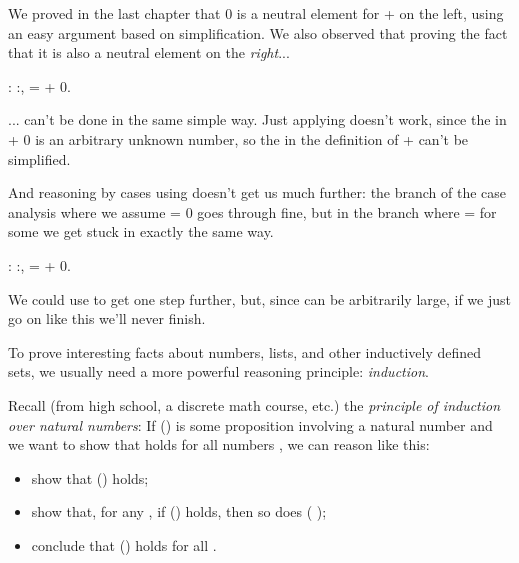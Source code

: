 \documentclass[12pt]{report}
\begin{document}
 We proved in the last chapter that 0 is a neutral element
    for + on the left, using an easy argument based on
    simplification.  We also observed that proving the fact that it is
    also a neutral element on the \textit{right}... \begin{coqdoccode}
\coqdocemptyline
\coqdocnoindent
{}  : \coqdockw{\ensuremath{\forall}} :,\coqdoceol
\coqdocindent{1.00em}
 =  + 0.\coqdoceol
\end{coqdoccode}
... can't be done in the same simple way.  Just applying
   doesn't work, since the  in  + 0 is an arbitrary
  unknown number, so the  in the definition of + can't be
  simplified.  \begin{coqdoccode}
\coqdocemptyline
\end{coqdoccode}
And reasoning by cases using   doesn't get us much
    further: the branch of the case analysis where we assume  = 0
    goes through fine, but in the branch where  =   for some  we
    get stuck in exactly the same way. \begin{coqdoccode}
\coqdocemptyline
\coqdocnoindent
{}  : \coqdockw{\ensuremath{\forall}} :,\coqdoceol
\coqdocindent{1.00em}
 =  + 0.\coqdoceol
\coqdocemptyline
\end{coqdoccode}
We could use   to get one step further, but,
    since  can be arbitrarily large, if we just go on like this
    we'll never finish. 

 To prove interesting facts about numbers, lists, and other
    inductively defined sets, we usually need a more powerful
    reasoning principle: \textit{induction}.


    Recall (from high school, a discrete math course, etc.) the
    \textit{principle of induction over natural numbers}: If () is some
    proposition involving a natural number  and we want to show
    that  holds for all numbers , we can reason like this:

\begin{itemize}
\item  show that () holds;

\item  show that, for any , if () holds, then so does
           ( );

\item  conclude that () holds for all .

\end{itemize}
\end{document}
